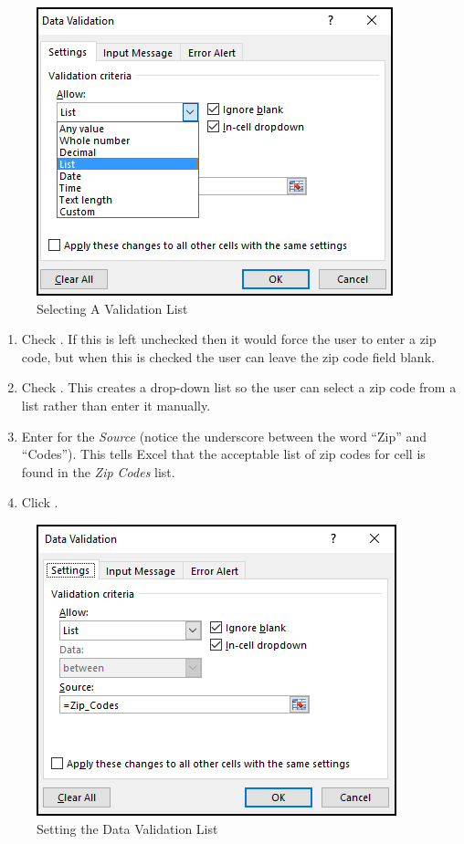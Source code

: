 \begin{figure}[H]
	\centering
	\includegraphics[width=\maxwidth{.75\linewidth}]{gfx/ch07_fig36}
	\caption{Selecting A Validation List}
	\label{07:fig36}
\end{figure}

\begin{enumerate}[resume]	
	\item Check . If this is left unchecked then it would force the user to enter a zip code, but when this is checked the user can leave the zip code field blank.
	\item Check . This creates a drop-down list so the user can select a zip code from a list rather than enter it manually.
	\item Enter  for the \textit{Source} (notice the underscore between the word ``Zip'' and ``Codes''). This tells Excel that the acceptable list of zip codes for cell  is found in the \textit{Zip Codes} list.
	\item Click .
\end{enumerate}

\begin{figure}[H]
	\centering
	\includegraphics[width=\maxwidth{.75\linewidth}]{gfx/ch07_fig37}
	\caption{Setting the Data Validation List}
	\label{07:fig37}
\end{figure}


